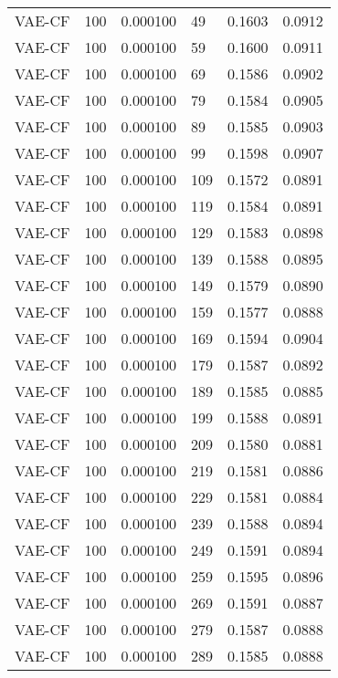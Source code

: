 \begin{tabular}{llrlrr}
  VAE-CF &  100 &  0.000100 &    49 &  0.1603 &       0.0912 \\
  VAE-CF &  100 &  0.000100 &    59 &  0.1600 &       0.0911 \\
  VAE-CF &  100 &  0.000100 &    69 &  0.1586 &       0.0902 \\
  VAE-CF &  100 &  0.000100 &    79 &  0.1584 &       0.0905 \\
  VAE-CF &  100 &  0.000100 &    89 &  0.1585 &       0.0903 \\
  VAE-CF &  100 &  0.000100 &    99 &  0.1598 &       0.0907 \\
  VAE-CF &  100 &  0.000100 &   109 &  0.1572 &       0.0891 \\
  VAE-CF &  100 &  0.000100 &   119 &  0.1584 &       0.0891 \\
  VAE-CF &  100 &  0.000100 &   129 &  0.1583 &       0.0898 \\
  VAE-CF &  100 &  0.000100 &   139 &  0.1588 &       0.0895 \\
  VAE-CF &  100 &  0.000100 &   149 &  0.1579 &       0.0890 \\
  VAE-CF &  100 &  0.000100 &   159 &  0.1577 &       0.0888 \\
  VAE-CF &  100 &  0.000100 &   169 &  0.1594 &       0.0904 \\
  VAE-CF &  100 &  0.000100 &   179 &  0.1587 &       0.0892 \\
  VAE-CF &  100 &  0.000100 &   189 &  0.1585 &       0.0885 \\
  VAE-CF &  100 &  0.000100 &   199 &  0.1588 &       0.0891 \\
  VAE-CF &  100 &  0.000100 &   209 &  0.1580 &       0.0881 \\
  VAE-CF &  100 &  0.000100 &   219 &  0.1581 &       0.0886 \\
  VAE-CF &  100 &  0.000100 &   229 &  0.1581 &       0.0884 \\
  VAE-CF &  100 &  0.000100 &   239 &  0.1588 &       0.0894 \\
  VAE-CF &  100 &  0.000100 &   249 &  0.1591 &       0.0894 \\
  VAE-CF &  100 &  0.000100 &   259 &  0.1595 &       0.0896 \\
  VAE-CF &  100 &  0.000100 &   269 &  0.1591 &       0.0887 \\
  VAE-CF &  100 &  0.000100 &   279 &  0.1587 &       0.0888 \\
  VAE-CF &  100 &  0.000100 &   289 &  0.1585 &       0.0888 \\

\end{tabular}

